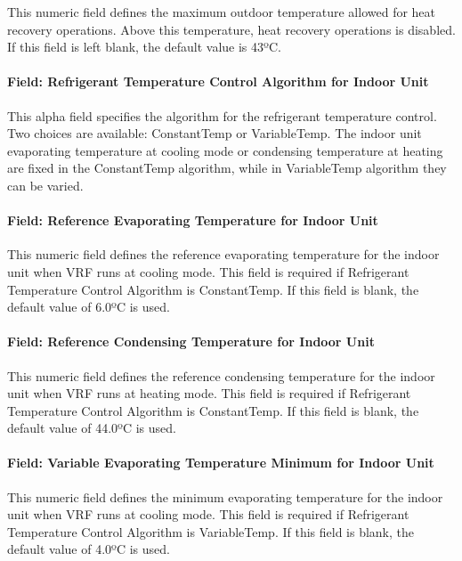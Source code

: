 This numeric field defines the maximum outdoor temperature allowed for heat recovery operations. Above this temperature, heat recovery operations is disabled. If this field is left blank, the default value is 43ºC.

\paragraph{Field: Refrigerant Temperature Control Algorithm for Indoor Unit}

This alpha field specifies the algorithm for the refrigerant temperature control. Two choices are available: ConstantTemp or VariableTemp. The indoor unit evaporating temperature at cooling mode or condensing temperature at heating are fixed in the ConstantTemp algorithm, while in VariableTemp algorithm they can be varied.

\paragraph{Field: Reference Evaporating Temperature for Indoor Unit}

This numeric field defines the reference evaporating temperature for the indoor unit when VRF runs at cooling mode. This field is required if Refrigerant Temperature Control Algorithm is ConstantTemp. If this field is blank, the default value of 6.0ºC is used.

\paragraph{Field: Reference Condensing Temperature for Indoor Unit}

This numeric field defines the reference condensing temperature for the indoor unit when VRF runs at heating mode. This field is required if Refrigerant Temperature Control Algorithm is ConstantTemp. If this field is blank, the default value of 44.0ºC is used.

\paragraph{Field: Variable Evaporating Temperature Minimum for Indoor Unit}

This numeric field defines the minimum evaporating temperature for the indoor unit when VRF runs at cooling mode. This field is required if Refrigerant Temperature Control Algorithm is VariableTemp. If this field is blank, the default value of 4.0ºC is used.

